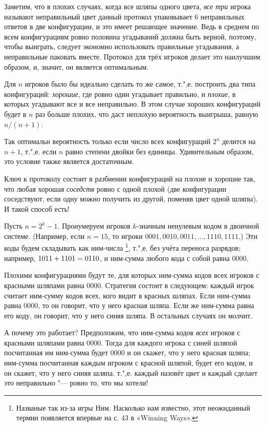 \documentclass[twoside]{book}
\begin{document}
Заметим, что в плохих случаях, когда все шляпы одного цвета, \emph{все три} игрока называют неправильный цвет данный протокол упаковывает 6 неправильных ответов в две конфигурации, и это имеет решающее значение.
Ведь в среднем по всем конфигурациям ровно половина угадываний должна быть верной, поэтому, чтобы выиграть, следует экономно использовать правильные угадывания, а неправильные паковать вместе.
Протокол для трёх игроков делает это наилучшим образом, и, значит, он является оптимальным.

Для $n$ игроков было бы идеально сделать то же самое,
т.",е. построить два типа конфигураций: \emph{хорошие}, где ровно один угадывает правильно, и \emph{плохие}, в которых угадывают все и все неправильно.
В этом случае хороших конфигураций будет в $n$ раз больше плохих,
что даст неплохую вероятность выигрыша, равную $n/(n+1)$.

Так оптимальн вероятность  только если число всех конфигураций $2^n$ делится на $n+1$,
т.",е. если $n$ равно степени двойки без единицы.
Удивительным образом, это условие также является достаточным.

Ключ к протоколу состоит в разбиении конфигураций на плохие и хорошие так, что любая хорошая \emph{соседств} ровно с одной плохой (две конфигурации соседствуют, если одну можно получить из другой, поменяв цвет одной шляпы).
И такой способ есть!

Пусть $n=2^k-1$.
Пронумеруем игроков $k$-значным ненулевым кодом в двоичной системе.
(Например, если $n=15$, то игроки  $0001,0010,0011,\dots,1110,1111$.)
Эти коды будем складывать как ним-числа%
\footnote{Названые так из-за игры Ним.
Насколько нам известно, этот неожиданный термин появляется впервые на с. 43 в  «Winning Ways».}, т.",е. без учёта переноса разрядов;
например, $1011 \z+ 1101 =0110$, и ним-сумма любого кода с собой равна $0000$.

Плохими конфигурациями будут те, для которых ним-сумма кодов всех игроков с красными шляпами равна $0000$.
Стратегия состоит в следующем:
каждый игрок считает ним-сумму кодов всех, кого видит в красных шляпах.
Если ним-сумма равна $0000$, то он говорит, что у него красная шляпа.
Если же ним-сумма равна его коду, он говорит, что у него синяя шляпа.
В остальных случаях он молчит.

А почему это работает?
Предположим, что ним-сумма кодов \emph{всех} игроков с красными шляпами равна $0000$.
Тогда для каждого игрока с синей шляпой посчитанная им ним-сумма будет  $0000$ и он скажет, что у него красная шляпа;
ним-сумма посчитанная каждым игроком с красной шляпой, будет его кодом, и он скажет, что у него синяя шляпа.
т.",е. каждый назовёт цвет и каждый сделает это неправильно "--- ровно то, что мы хотели!
\end{document}
